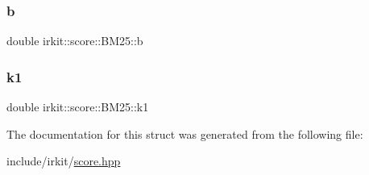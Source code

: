 \subsubsection{\texorpdfstring{b}{b}}
{\footnotesize\ttfamily double irkit\+::score\+::\+B\+M25\+::b}

\mbox{\label{structirkit_1_1score_1_1BM25_a466bb269c6c56714e0148d428bd7e1d5}} 
\subsubsection{\texorpdfstring{k1}{k1}}
{\footnotesize\ttfamily double irkit\+::score\+::\+B\+M25\+::k1}



The documentation for this struct was generated from the following file\+:\begin{DoxyCompactItemize}
\item 
include/irkit/\mbox{\hyperlink{score_8hpp}{score.\+hpp}}\end{DoxyCompactItemize}
